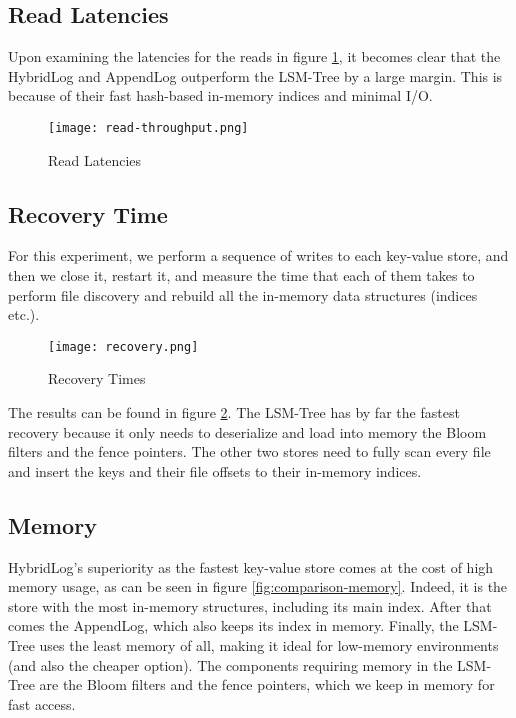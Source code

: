\subsection{Read Latencies}

Upon examining the latencies for the reads in figure \ref{fig:comparison-read-latencies}, it becomes clear that the HybridLog and AppendLog outperform the LSM-Tree by a large margin. This is because of their fast hash-based in-memory indices and minimal I/O.

\begin{figure}[h]
    \centering
    \texttt{[image: read-throughput.png]}
    \caption{Read Latencies}
    \label{fig:comparison-read-latencies}
\end{figure}

\subsection{Recovery Time}

For this experiment, we perform a sequence of writes to each key-value store, and then we close it, restart it, and measure the time that each of them takes to perform file discovery and rebuild all the in-memory data structures (indices etc.).

\begin{figure}[h]
    \centering
    \texttt{[image: recovery.png]}
    \caption{Recovery Times}
    \label{fig:recovery}
\end{figure}

The results can be found in figure \ref{fig:recovery}. The LSM-Tree has by far the fastest recovery because it only needs to deserialize and load into memory the Bloom filters and the fence pointers. The other two stores need to fully scan every file and insert the keys and their file offsets to their in-memory indices.

\subsection{Memory}

HybridLog's superiority as the fastest key-value store comes at the cost of high memory usage, as can be seen in figure \ref{fig:comparison-memory}. Indeed, it is the store with the most in-memory structures, including its main index. After that comes the AppendLog, which also keeps its index in memory. Finally, the LSM-Tree uses the least memory of all, making it ideal for low-memory environments (and also the cheaper option). The components requiring memory in the LSM-Tree are the Bloom filters and the fence pointers, which we keep in memory for fast access.

